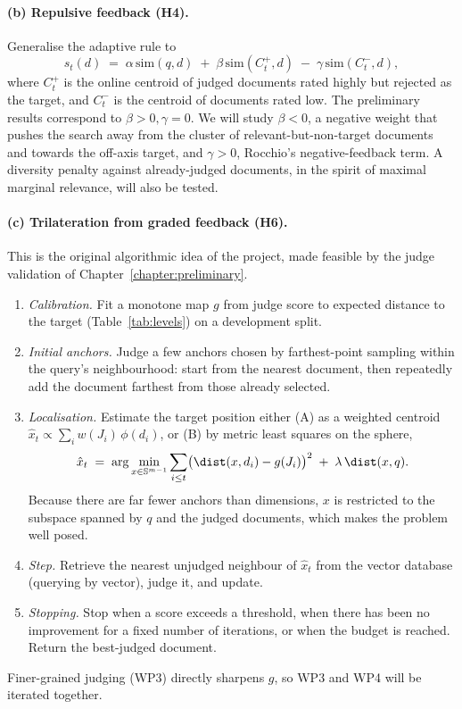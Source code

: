 \paragraph{(b) Repulsive feedback (H4).}
Generalise the adaptive rule to
\begin{equation}
  s_t(d) \;=\; \alpha\,\mathrm{sim}(q,d) \;+\; \beta\,\mathrm{sim}(C_t^{+},d) \;-\; \gamma\,\mathrm{sim}(C_t^{-},d),
\end{equation}
where $C_t^{+}$ is the online centroid of judged documents rated highly but rejected as the target, and $C_t^{-}$ is the centroid of documents rated low. The preliminary results correspond to $\beta>0,\gamma=0$. We will study $\beta<0$, a negative weight that pushes the search away from the cluster of relevant-but-non-target documents and towards the off-axis target, and $\gamma>0$, Rocchio's negative-feedback term. A diversity penalty against already-judged documents, in the spirit of maximal marginal relevance, will also be tested.

\paragraph{(c) Trilateration from graded feedback (H6).}
This is the original algorithmic idea of the project, made feasible by the judge validation of Chapter~\ref{chapter:preliminary}.
\begin{enumerate}
  \item \emph{Calibration.} Fit a monotone map $g$ from judge score to expected distance to the target (Table~\ref{tab:levels}) on a development split.
  \item \emph{Initial anchors.} Judge a few anchors chosen by farthest-point sampling within the query's neighbourhood: start from the nearest document, then repeatedly add the document farthest from those already selected.
  \item \emph{Localisation.} Estimate the target position either (A) as a weighted centroid $\hat x_t\propto\sum_i w(J_i)\,\phi(d_i)$, or (B) by metric least squares on the sphere,
  \begin{equation}
    \hat x_t \;=\; \arg\min_{x\in\mathbb{S}^{m-1}} \sum_{i\le t} \bigl(\dist(x,d_i)-g(J_i)\bigr)^2 \;+\; \lambda\,\dist(x,q).
  \end{equation}
  Because there are far fewer anchors than dimensions, $x$ is restricted to the subspace spanned by $q$ and the judged documents, which makes the problem well posed.
  \item \emph{Step.} Retrieve the nearest unjudged neighbour of $\hat x_t$ from the vector database (querying by vector), judge it, and update.
  \item \emph{Stopping.} Stop when a score exceeds a threshold, when there has been no improvement for a fixed number of iterations, or when the budget is reached. Return the best-judged document.
\end{enumerate}
Finer-grained judging (WP3) directly sharpens $g$, so WP3 and WP4 will be iterated together.

